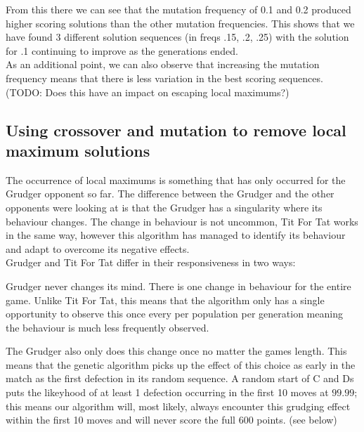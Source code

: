 
From this there we can see that the mutation frequency of 0.1 and 0.2 produced higher scoring solutions than the other mutation frequencies. This shows that we have found 3 different solution sequences (in freqs .15, .2, .25) with the solution for .1 continuing to improve as the generations ended.\\
            
As an additional point, we can also observe that increasing the mutation frequency means that there is less variation in the best scoring sequences. (TODO: Does this have an impact on escaping local maximums?)

\subsection{Using crossover and mutation to remove local maximum solutions}
The occurrence of local maximums is something that has only occurred for the Grudger opponent so far. The difference between the Grudger and the other opponents were looking at is that the Grudger has a singularity where its behaviour changes. The change in behaviour is not uncommon, Tit For Tat works in the same way, however this algorithm has managed to identify its behaviour and adapt to overcome its negative effects.\\
            
Grudger and Tit For Tat differ in their responsiveness in two ways: 
            
\begin{itemize}
    \begin{item}
        Grudger never changes its mind. There is one change in behaviour for the entire game. Unlike Tit For Tat, this means that the algorithm only has a single opportunity to observe this once every per population per generation meaning the behaviour is much less frequently observed.
    \end{item}
    \begin{item}
        The Grudger also only does this change once no matter the games length. This means that the genetic algorithm picks up the effect of this choice as early in the match as the first defection in its random sequence. A random start of C and Ds puts the likeyhood of at least 1 defection occurring in the first 10 moves at \(99.99\); this means our algorithm will, most likely, always encounter this grudging effect within the first 10 moves and will never score the full 600 points. (see below)
    \end{item}
\end{itemize}
            

